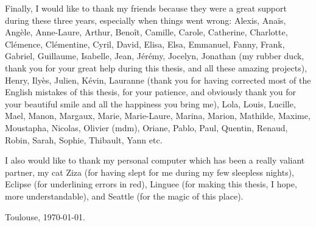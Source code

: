 Finally, I would like to thank my friends because they were a great support during these three years,
especially when things went wrong: 
Alexis, Ana\"is, Ang\`ele, Anne-Laure, Arthur, Beno\^it, Camille, Carole, Catherine, Charlotte, Cl\'emence, Cl\'ementine, Cyril, David, Elisa, Elsa, Emmanuel, Fanny,
Frank, Gabriel, Guillaume, Isabelle, Jean, J\'er\'emy, Jocelyn, 
Jonathan (my rubber duck, thank you for your great help during this thesis, and all these amazing projects), 
Henry, Ily\`es, Julien, K\'evin,
Lauranne (thank you for having corrected most of the English mistakes of this thesis, 
for your patience, and obviously thank you for your beautiful smile
and all the happiness you bring me), 
Lola, Louis, Lucille, Mael, Manon, Margaux, Marie, Marie-Laure, Marina, 
Marion, Mathilde, Maxime, Moustapha, Nicolas, Olivier (mdm), Oriane, 
Pablo, Paul, Quentin, Renaud, Robin, Sarah, Sophie, Thibault, Yann etc.

I also would like to thank my personal computer which has been a really valiant partner, 
my cat Ziza (for having slept for me during my few sleepless nights),
Eclipse (for underlining errors in red), 
Linguee (for making this thesis, I hope, more understandable),
and Seattle (for the magic of this place).


\vspace{2cm}

\hfill Toulouse, \today.
